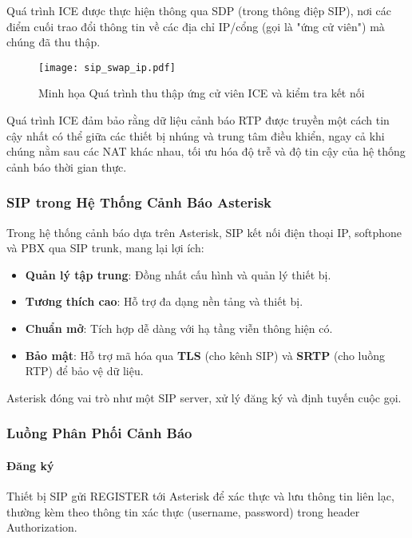 Quá trình ICE được thực hiện thông qua SDP (trong thông điệp SIP), nơi các điểm cuối trao đổi thông tin về các địa chỉ IP/cổng (gọi là "ứng cử viên") mà chúng đã thu thập.

\begin{figure}[h]
    \centering
    \texttt{[image: sip\_swap\_ip.pdf]}
    \caption{Minh họa Quá trình thu thập ứng cử viên ICE và kiểm tra kết nối}
    \label{fig:ice_flow_symmetric}
\end{figure}

Quá trình ICE đảm bảo rằng dữ liệu cảnh báo RTP được truyền một cách tin cậy nhất có thể giữa các thiết bị nhúng và trung tâm điều khiển, ngay cả khi chúng nằm sau các NAT khác nhau, tối ưu hóa độ trễ và độ tin cậy của hệ thống cảnh báo thời gian thực.

\subsubsection{SIP trong Hệ Thống Cảnh Báo Asterisk}
\label{subsubsec:sip_asterisk_integration}

Trong hệ thống cảnh báo dựa trên Asterisk, SIP kết nối điện thoại IP, softphone và PBX qua SIP trunk, mang lại lợi ích:

\begin{itemize}
\item \textbf{Quản lý tập trung}: Đồng nhất cấu hình và quản lý thiết bị.
\item \textbf{Tương thích cao}: Hỗ trợ đa dạng nền tảng và thiết bị.
\item \textbf{Chuẩn mở}: Tích hợp dễ dàng với hạ tầng viễn thông hiện có.
\item \textbf{Bảo mật}: Hỗ trợ mã hóa qua \textbf{TLS} (cho kênh SIP) và \textbf{SRTP} (cho luồng RTP) để bảo vệ dữ liệu.
\end{itemize}

Asterisk đóng vai trò như một SIP server, xử lý đăng ký và định tuyến cuộc gọi.

\subsubsection{Luồng Phân Phối Cảnh Báo}
\label{subsubsec:sip_alert_flows}

\paragraph{Đăng ký}
Thiết bị SIP gửi REGISTER tới Asterisk để xác thực và lưu thông tin liên lạc, thường kèm theo thông tin xác thực (username, password) trong header Authorization.

